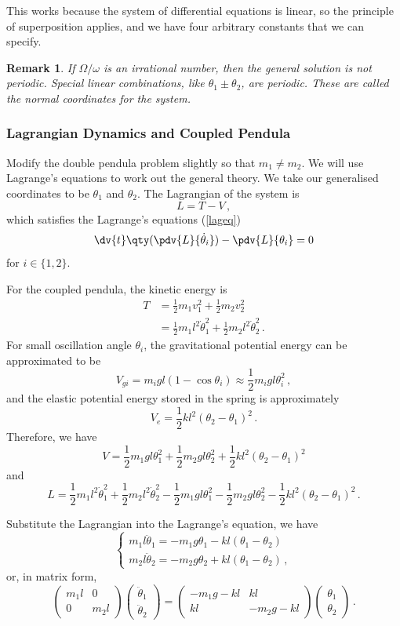 \documentclass{article}
\theoremstyle{plain}\theoremheaderfont{\normalfont\itshape}\theorembodyfont{\rmfamily}\theoremseparator{.}\newtheorem*{rem}{Remark}\newtheorem*{ex}{Example}\newtheorem*{proof}{Proof}\newtheorem*{altp}{Alternative proof}
\theoremstyle{plain}\theoremheaderfont{\normalfont\bfseries}\theorembodyfont{\rmfamily}\theoremseparator{.}\newtheorem{thm}{Theorem}[section]\newtheorem{lem}[thm]{Lemma}\newtheorem{prop}[thm]{Proposition}\newtheorem*{cor}{Corollary}\newtheorem{defn}[thm]{Definition}\newtheorem{clm}[thm]{Claim}\newtheorem{clminproof}{Claim}
\theoremstyle{break}\theoremheaderfont{\normalfont\itshape}\theorembodyfont{\rmfamily}\theoremseparator{.\medskip}\newtheorem*{proofskip}{Proof}\newtheorem*{exs}{Examples}\newtheorem*{rems}{Remarks}
\theoremstyle{break}\theoremheaderfont{\normalfont\bfseries}\theorembodyfont{\rmfamily}\theoremseparator{.\medskip}\newtheorem{lemskip}[thm]{Lemma}\newtheorem{defnskip}[thm]{Definition}\newtheorem{propskip}[thm]{Proposition}\newtheorem{thmskip}[thm]{Theorem}
\numberwithin{equation}{section}
\begin{document}
	This works because the system of differential equations is linear, so the principle of superposition applies, and we have four arbitrary constants that we can specify.
	\begin{rem}
		If \(\Omega/\omega\) is an irrational number, then the general solution is not periodic. Special linear combinations, like \(\theta_1\pm\theta_2\), are periodic. These are called the \textit{normal coordinates} for the system.
	\end{rem}
	\subsubsection{Lagrangian Dynamics and Coupled Pendula}
	Modify the double pendula problem slightly so that \(m_1\ne m_2\). We will use Lagrange's equations to work out the general theory. We take our generalised coordinates to be \(\theta_1\) and \(\theta_2\). The Lagrangian of the system is
	\[L=T-V\,,\]
	which satisfies the Lagrange's equations (\cref{lageq})
	\[\dv{t}\qty(\pdv{L}{\dot{\theta}_i})-\pdv{L}{\theta_i}=0\]
	for \(i\in\{1,2\}\).

	For the coupled pendula, the kinetic energy is
	\begin{align*}
		T&=\frac{1}{2}m_1v_1^2+\frac{1}{2}m_2v_2^2\\
		&=\frac{1}{2}m_1l^2\dot{\theta}_1^2+\frac{1}{2}m_2l^2\dot{\theta}_2^2\,.
	\end{align*}
	For small oscillation angle \(\theta_i\), the gravitational potential energy can be approximated to be
	\[V_{gi}=m_igl(1-\cos\theta_i)\approx\frac{1}{2}m_i gl\theta_i^2\,,\]
	and the elastic potential energy stored in the spring is approximately
	\[V_{e}=\frac{1}{2}kl^2(\theta_2-\theta_1)^2\,.\]
	Therefore, we have
	\[V=\frac{1}{2}m_1gl\theta_1^2+\frac{1}{2}m_2gl\theta_2^2+\frac{1}{2}kl^2(\theta_2-\theta_1)^2\]
	and
	\[L=\frac{1}{2}m_1l^2\dot{\theta}_1^2+\frac{1}{2}m_2l^2\dot{\theta}_2^2-\frac{1}{2}m_1gl\theta_1^2-\frac{1}{2}m_2gl\theta_2^2-\frac{1}{2}kl^2(\theta_2-\theta_1)^2\,.\]

	Substitute the Lagrangian into the Lagrange's equation, we have
	\[\begin{cases}
		m_1l\ddot{\theta}_1=-m_1g\theta_1-kl(\theta_1-\theta_2)\\
		m_2l\ddot{\theta}_2=-m_2g\theta_2+kl(\theta_1-\theta_2)\,,
	\end{cases}\]
	or, in matrix form,
	\begin{equation}\tag{\(\dagger\)}
		\begin{pmatrix}
			m_1l & 0\\
			0 & m_2l
		\end{pmatrix}\begin{pmatrix}
			\ddot{\theta}_1 \\ \ddot{\theta}_2
		\end{pmatrix}=\begin{pmatrix}
			-m_1g-kl & kl \\
			kl & -m_2g-kl
		\end{pmatrix}\begin{pmatrix}
			\theta_1 \\ \theta_2
		\end{pmatrix}\,.
	\end{equation}
	
\end{document}
